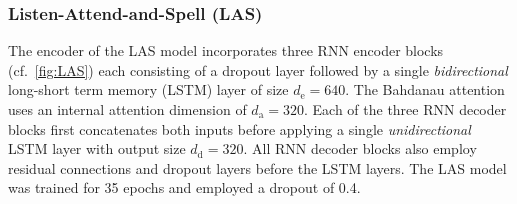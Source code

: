 \documentclass{article}
\begin{document}
\subsubsection{Listen-Attend-and-Spell (LAS)}\label{sec:LAS}	\vspace{-2.5mm}
The encoder of the LAS model incorporates three RNN encoder blocks (cf.~\ref{fig:LAS}) each consisting of a dropout layer followed by a single \textit{bidirectional} long-short term memory (LSTM) layer of size $d_\mathrm{e}\!=\!640$. The Bahdanau attention uses an internal attention dimension of $d_\mathrm{a}\!=\!320$. Each of the three RNN decoder blocks first concatenates both inputs before applying a single \textit{unidirectional} LSTM layer with output size $d_\mathrm{d}\!=\!320$. All RNN decoder blocks also employ residual connections and dropout layers before the LSTM layers. The LAS model was trained for 35 epochs and employed a dropout of 0.4.  
\vspace{-2mm}

\newcommand{\f}[1]{\textbf{#1}}
\newcommand{\s}[1]{\underline{#1}}
\renewcommand{\tabcolsep}{0.15cm}
\renewcommand{\arraystretch}{0.95}

\renewcommand{\l}[1]{\small\tt{#1}}
\end{document}
